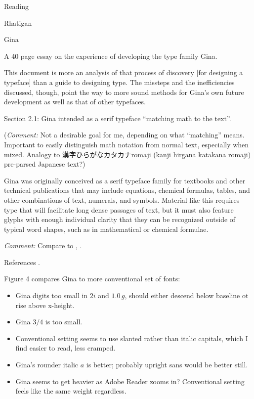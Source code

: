 \documentclass[11pt]{PalisadesLakesBook}
\begin{document}
\begin{plSection}{Reading}
\begin{plSection}{Rhatigan}
\begin{plSection}{Gina}
\begin{plSection}{}

A 40 page essay on the experience of developing the type family
Gina.

\begin{plQuote}{}{}
This document is more an analysis of that process of discovery
[for designing a typeface]
than a guide to designing type.
The missteps and the inefficiencies discussed, though, 
point the way to more sound methods for 
Gina's own future development as well as that of other typefaces.
\end{plQuote}

Section 2.1: Gina intended as a serif typeface 
``matching math to the text''.

(\emph{Comment:} Not a desirable goal for me, depending
on what ``matching'' means.
Important to easily distinguish math notation from normal text,
especially when mixed. 
Analogy to 漢字\allowbreak ひらがな\allowbreak カタカナ\allowbreak romaji
(kanji hirgana katakana romaji) pre-parsed Japanese text?)


\begin{plQuote}{}{}
Gina was originally conceived as a serif typeface family
for textbooks and other technical publications that may include
equations, chemical formulas, tables, and other combinations of
text, numerals, and symbols.
Material like this requires type that will facilitate long dense
passages of text, but it must also feature glyphs with enough
individual clarity that they can be recognized outside of typical
word shapes, such as in mathematical or chemical formulae.
\end{plQuote}

\emph{Comment:} 
Compare to ,
.

References .

Figure 4 compares Gina to more conventional set of fonts:
\begin{itemize}
  \item Gina digits too small in $2i$ and $1.0\,g$, 
  should either descend below baseline ot rise above x-height.
  \item Gina $3/4$ is too small.
  \item Conventional setting seems to use slanted rather 
  than italic capitals, which I find easier to read, less cramped.
  \item Gina's rounder italic $\mathit{a}$ is better; 
  probably upright sans would be better still.
  \item Gina seems to get heavier as Adobe Reader zooms in?
  Conventional setting feels like the same weight regardless. 
\end{itemize}


\end{plSection}
\end{plSection}
\end{plSection}
\end{plSection}
\end{document}
